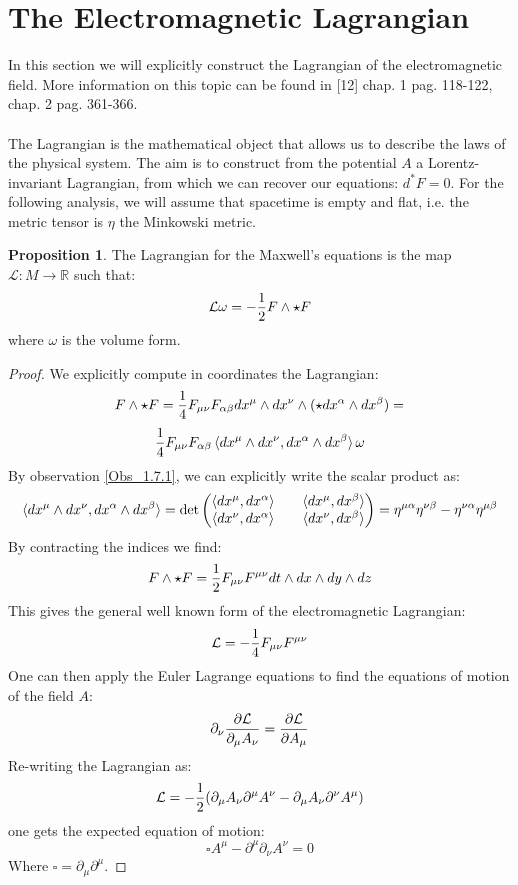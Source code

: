 \documentclass[12pt,a4paper]{report}
\theoremstyle{definition}
\theoremstyle{Theorem}
\newtheorem{Prop}[Def]{Proposition}
\theoremstyle{definition}
\theoremstyle{definition}
\begin{document}
	\section{The Electromagnetic Lagrangian}
	In this section we will explicitly construct the Lagrangian of the electromagnetic field. More information on this topic can be found in [12] chap. 1 pag. 118-122, chap. 2 pag. 361-366.
	\\\\
	The Lagrangian is the mathematical object that allows us to describe the laws of the physical system. The aim is to construct from the potential $A$ a Lorentz-invariant Lagrangian, from which we can recover our equations: $d^*F=0$. For the following analysis, we will assume that spacetime is empty and flat, i.e. the metric tensor is $\eta$ the Minkowski metric. 
	\begin{Prop}\label{Prop_8.1.2}
		The Lagrangian for the Maxwell's equations is the map $\mathcal{L}:M\rightarrow \mathbb{R}$ such that:
		$$\mathcal{L}\omega=-{1\over 2}F\wedge \star F$$
		where $\omega$ is the volume form.
	\end{Prop}
	\begin{proof}
		We explicitly compute in coordinates the Lagrangian:
		$$F\wedge \star F={1\over 4}F_{\mu\nu}F_{\alpha\beta}dx^\mu\wedge dx^\nu \wedge (\star dx^\alpha\wedge dx^\beta)=$$
		$${1\over 4}F_{\mu\nu}F_{\alpha\beta}\braket{dx^\mu\wedge dx^\nu,dx^\alpha\wedge dx^\beta}\omega$$
		By observation \ref{Obs_1.7.1}, we can explicitly write the scalar product as:
		$$\braket{dx^\mu\wedge dx^\nu,dx^\alpha\wedge dx^\beta}=\det
		\begin{pmatrix}
			\braket{dx^\mu,dx^\alpha} && \braket{dx^\mu,dx^\beta}\\
			\braket{dx^\nu,dx^\alpha} && \braket{dx^\nu,dx^\beta}\\
		\end{pmatrix}=\eta^{\mu\alpha}\eta^{\nu\beta}-\eta^{\nu\alpha}\eta^{\mu\beta}$$
		By contracting the indices we find:
		$$F\wedge \star F={1\over 2}F_{\mu\nu}F^{\mu\nu}dt\wedge dx\wedge dy\wedge dz$$
		This gives the general well known form of the electromagnetic Lagrangian:
		\begin{equation}\label{E_M_Lag}
			\mathcal{L}=-{1\over 4}F_{\mu\nu}F^{\mu\nu}
		\end{equation}
		One can then apply the Euler Lagrange equations to find the equations of motion of the field $A$:
		$$\partial_\nu{\partial \mathcal{L}\over \partial_\mu A_\nu}={\partial \mathcal{L}\over \partial A_\mu}$$
		Re-writing the Lagrangian as:
		$$\mathcal{L}=-{1\over 2}(\partial_\mu A_\nu\partial^\mu A^\nu-\partial_\mu A_\nu\partial^\nu A^\mu)$$
		one gets the expected equation of motion:
		$$\square A^\mu-\partial^\mu\partial_\nu A^\nu=0$$
		Where $\square=\partial_\mu\partial^\mu$.
	\end{proof}
\end{document}

